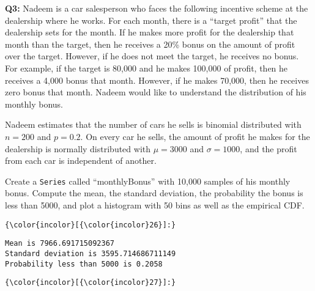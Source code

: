 \documentclass{scrreprt}
\begin{document}
    
    

    \begin{center}
    \end{center}

    
    \textbf{Q3:} Nadeem is a car salesperson who faces the following
incentive scheme at the dealership where he works. For each month, there
is a ``target profit'' that the dealership sets for the month. If he
makes more profit for the dealership that month than the target, then he
receives a 20\% bonus on the amount of profit over the target. However,
if he does not meet the target, he receives no bonus. For example, if
the target is 80,000 and he makes 100,000 of profit, then he receives a
4,000 bonus that month. However, if he makes 70,000, then he receives
zero bonus that month. Nadeem would like to understand the distribution
of his monthly bonus.

Nadeem estimates that the number of cars he sells is binomial
distributed with \(n=200\) and \(p=0.2\). On every car he sells, the
amount of profit he makes for the dealership is normally distributed
with \(\mu=3000\) and \(\sigma=1000\), and the profit from each car is
independent of another.

Create a \texttt{Series} called ``monthlyBonus'' with 10,000 samples of
his monthly bonus. Compute the mean, the standard deviation, the
probability the bonus is less than 5000, and plot a histogram with 50
bins as well as the empirical CDF.

	
\begin{Verbatim}[commandchars=\\\{\}]
{\color{incolor}[{\color{incolor}26}]:} 
\end{Verbatim}
\begin{Verbatim}[commandchars=\\\{\}]
Mean is 7966.691715092367
Standard deviation is 3595.714686711149
Probability less than 5000 is 0.2058

\end{Verbatim}

	

    
   

    \begin{center}
    \end{center}
    
	
\begin{Verbatim}[commandchars=\\\{\}]
{\color{incolor}[{\color{incolor}27}]:} 
\end{Verbatim}
	
\end{document}
